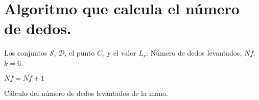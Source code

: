 \appendix{}

\chapter{Algoritmo que calcula el número de dedos.} \label{capit:apendC}
%
\setcounter{figure}{0}


\begin{algorithm}[h!]
\begin{algorithmic}[1]
\REQUIRE Los conjuntos $\mathcal{S}$, $\mathcal{D}$, el punto $C_r$ y el valor $L_r$.   
\ENSURE Número de dedos levantados, $Nf$.  
	\STATE $k=6$. 	
	
	\STATE $Nf=Nf+1$
	\ENDIF 
\ENDFOR 

\caption{Cálculo del número de dedos levantados de la mano.}
\label{alg:NumDedos} 
\end{algorithmic}
\end{algorithm} 
